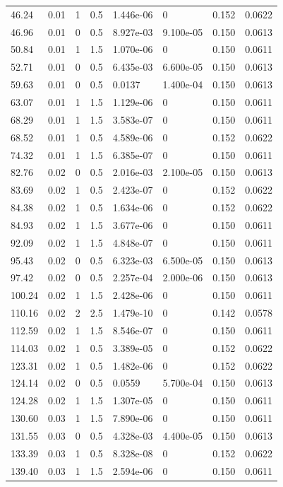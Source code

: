 \documentclass[preview]{standalone}
\begin{document}
{{\begin{tabular}{L{1.2cm}C{1.2cm} C{0.3cm}C{0.5cm} C{1.4cm}C{1.4cm} C{1.4cm}C{1.4cm}}
  46.24  &  0.01  & 1     & 0.5 &  1.446e-06  & 0  & 0.152 &  0.0622   \\ 
  46.96  &  0.01  & 0     & 0.5 &  8.927e-03  & 9.100e-05  & 0.150 &  0.0613   \\ 
  50.84  &  0.01  & 1     & 1.5 &  1.070e-06  & 0  & 0.150 &  0.0611   \\ 
  52.71  &  0.01  & 0     & 0.5 &  6.435e-03  & 6.600e-05  & 0.150 &  0.0613   \\ 
  59.63  &  0.01  & 0     & 0.5 &  0.0137  & 1.400e-04  & 0.150 &  0.0613   \\ 
  63.07  &  0.01  & 1     & 1.5 &  1.129e-06  & 0  & 0.150 &  0.0611   \\ 
  68.29  &  0.01  & 1     & 1.5 &  3.583e-07  & 0  & 0.150 &  0.0611   \\ 
  68.52  &  0.01  & 1     & 0.5 &  4.589e-06  & 0  & 0.152 &  0.0622   \\ 
  74.32  &  0.01  & 1     & 1.5 &  6.385e-07  & 0  & 0.150 &  0.0611   \\ 
  82.76  &  0.02  & 0     & 0.5 &  2.016e-03  & 2.100e-05  & 0.150 &  0.0613   \\ 
  83.69  &  0.02  & 1     & 0.5 &  2.423e-07  & 0  & 0.152 &  0.0622   \\ 
  84.38  &  0.02  & 1     & 0.5 &  1.634e-06  & 0  & 0.152 &  0.0622   \\ 
  84.93  &  0.02  & 1     & 1.5 &  3.677e-06  & 0  & 0.150 &  0.0611   \\ 
  92.09  &  0.02  & 1     & 1.5 &  4.848e-07  & 0  & 0.150 &  0.0611   \\ 
  95.43  &  0.02  & 0     & 0.5 &  6.323e-03  & 6.500e-05  & 0.150 &  0.0613   \\ 
  97.42  &  0.02  & 0     & 0.5 &  2.257e-04  & 2.000e-06  & 0.150 &  0.0613   \\ 
  100.24  &  0.02  & 1     & 1.5 &  2.428e-06  & 0  & 0.150 &  0.0611   \\ 
  110.16  &  0.02  & 2     & 2.5 &  1.479e-10  & 0  & 0.142 &  0.0578   \\ 
  112.59  &  0.02  & 1     & 1.5 &  8.546e-07  & 0  & 0.150 &  0.0611   \\ 
  114.03  &  0.02  & 1     & 0.5 &  3.389e-05  & 0  & 0.152 &  0.0622   \\ 
  123.31  &  0.02  & 1     & 0.5 &  1.482e-06  & 0  & 0.152 &  0.0622   \\ 
  124.14  &  0.02  & 0     & 0.5 &  0.0559  & 5.700e-04  & 0.150 &  0.0613   \\ 
  124.28  &  0.02  & 1     & 1.5 &  1.307e-05  & 0  & 0.150 &  0.0611   \\ 
  130.60  &  0.03  & 1     & 1.5 &  7.890e-06  & 0  & 0.150 &  0.0611   \\ 
  131.55  &  0.03  & 0     & 0.5 &  4.328e-03  & 4.400e-05  & 0.150 &  0.0613   \\ 
  133.39  &  0.03  & 1     & 0.5 &  8.328e-08  & 0  & 0.152 &  0.0622   \\ 
  139.40  &  0.03  & 1     & 1.5 &  2.594e-06  & 0  & 0.150 &  0.0611   \\ 
\hline 
\end{tabular} 

}}
\end{document}
